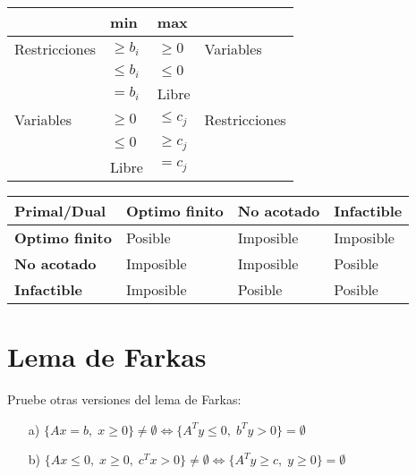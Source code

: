 \documentclass[10pt]{article}
\theoremstyle{plain}
\theoremstyle{definition}
\begin{document}
\begin{table}[h]
\begin{center}
\begin{tabular}{|l|l|l|l|}
\hline
                               & min          & max          &                                \\ \hline
\multirow{}{}{Restricciones} & $\geq b_{i}$ & $\geq 0$     & \multirow{}{}{Variables}     \\ \cline{2-3}
                               & $\leq b_{i}$ & $\leq 0$     &                                \\ \cline{2-3}
                               & $= b_{i}$    & Libre        &                                \\ \hline
\multirow{}{}{Variables}     & $\geq 0$     & $\leq c_{j}$ & \multirow{}{}{Restricciones} \\ \cline{2-3}
                               & $\leq 0$     & $\geq c_{j}$ &                                \\ \cline{2-3}
                               & Libre        & $= c_{j}$    &                                \\ \hline
\end{tabular}
\begin{tabular}{|l|l|l|l|}
\hline
\textbf{Primal/Dual}   & \textbf{Optimo finito} & \textbf{No acotado} & \textbf{Infactible} \\ \hline
\textbf{Optimo finito} & Posible                & Imposible           & Imposible           \\ \hline
\textbf{No acotado}    & Imposible              & Imposible           & Posible             \\ \hline
\textbf{Infactible}    & Imposible              & Posible             & Posible             \\ \hline
\end{tabular}
\end{center}
\end{table}

\section{Lema de Farkas}
Pruebe otras versiones del lema de Farkas:

\begin{itemize}
\item[a)] $\{Ax=b, \; x\geq0\}\neq\emptyset \iff \{A^{T}y\leq0, \; b^{T}y>0\}=\emptyset$

\item[b)] $\{Ax\leq0, \; x\geq0, \; c^{T}x>0\}\neq\emptyset \iff \{A^{T}y\geq c, \; y\geq0\}=\emptyset$
\end{itemize}
\end{document}
